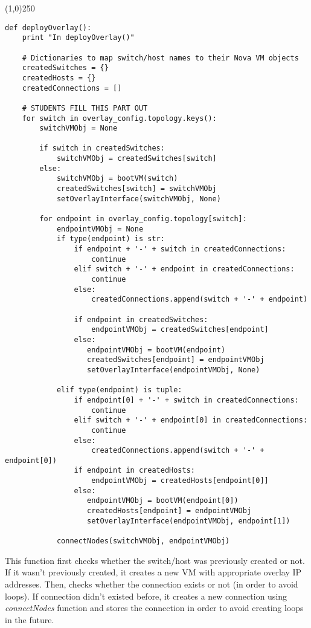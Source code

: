 \documentclass[12pt]{article}
\begin{document}
\begin{center}
	\line(1,0){250}
\end{center}
\begin{verbatim}
def deployOverlay():
    print "In deployOverlay()"

    # Dictionaries to map switch/host names to their Nova VM objects
    createdSwitches = {}
    createdHosts = {}
    createdConnections = []

    # STUDENTS FILL THIS PART OUT
    for switch in overlay_config.topology.keys():
        switchVMObj = None

        if switch in createdSwitches:
            switchVMObj = createdSwitches[switch]
        else:
            switchVMObj = bootVM(switch)
            createdSwitches[switch] = switchVMObj
            setOverlayInterface(switchVMObj, None)

        for endpoint in overlay_config.topology[switch]:
            endpointVMObj = None
            if type(endpoint) is str:
                if endpoint + '-' + switch in createdConnections:
                    continue
                elif switch + '-' + endpoint in createdConnections:
                    continue
                else:
                    createdConnections.append(switch + '-' + endpoint)

                if endpoint in createdSwitches:
                    endpointVMObj = createdSwitches[endpoint]
                else:
                   endpointVMObj = bootVM(endpoint)
                   createdSwitches[endpoint] = endpointVMObj
                   setOverlayInterface(endpointVMObj, None)

            elif type(endpoint) is tuple:
                if endpoint[0] + '-' + switch in createdConnections:
                    continue
                elif switch + '-' + endpoint[0] in createdConnections:
                    continue
                else:
                    createdConnections.append(switch + '-' + endpoint[0])
                if endpoint in createdHosts:
                    endpointVMObj = createdHosts[endpoint[0]]
                else:
                   endpointVMObj = bootVM(endpoint[0])
                   createdHosts[endpoint] = endpointVMObj
                   setOverlayInterface(endpointVMObj, endpoint[1])

            connectNodes(switchVMObj, endpointVMObj)
\end{verbatim}

This function first checks whether the switch/host was previously created or not. If it wasn't previously created, it creates a new VM with appropriate overlay IP addresses. Then, checks whether the connection exists or not (in order to avoid loops). If connection didn't existed before, it creates a new connection using \textit{connectNodes} function and stores the connection in order to avoid creating loops in the future.
\end{document}
